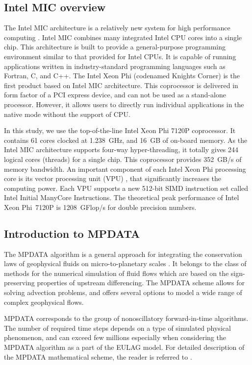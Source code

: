 \documentclass{acm_proc_article-sp}
\begin{document}
\subsection{Intel MIC overview}

The Intel MIC architecture is a relatively new system for high performance computing \cite{MICA}.
Intel MIC combines many integrated Intel CPU cores into a single chip.
This architecture is built to provide a general-purpose programming environment similar to that provided for Intel CPUs.
It is capable of running applications written in industry-standard programming languages such as Fortran, C, and C++.
The Intel Xeon Phi (codenamed Knights Corner) is the first product based on Intel MIC architecture.
This coprocessor is delivered in form factor of a PCI express device, and can not be used as a stand-alone processor.
However, it allows users to directly run individual applications in the native mode without the support of CPU.

In this study, we use the top-of-the-line Intel Xeon Phi 7120P coprocessor.
It contains 61 cores clocked at 1.238~GHz, and 16~GB of on-board memory.
As the Intel MIC architecture supports four-way hyper-threading, it totally gives 244 logical cores (threads) for a single chip.
This coprocessor provides 352~GB/s of memory bandwidth.
An important component of each Intel Xeon Phi processing core is its vector processing unit (VPU) \cite{SZU15}, that significantly increases the computing power.
Each VPU supports a new 512-bit SIMD instruction set called Intel Initial ManyCore Instructions.   
The theoretical peak performance of Intel Xeon Phi~7120P is 1208~GFlop/s for double precision numbers.

\subsection{Introduction to MPDATA}

The MPDATA algorithm is a general approach for integrating the conservation laws of geophysical fluids on micro-to-planetary scales \cite{SMO01}.
It belongs to the class of methods for the numerical simulation of fluid flows which are based on the sign-preserving properties of upstream differencing.
The MPDATA scheme allows for solving advection problems, and offers several options to model a wide range of complex geophysical flows.

MPDATA corresponds to the group of nonoscillatory forward-in-time algorithms.
The number of required time steps depends on a type of simulated physical phenomenon, and can exceed few millions especially when considering the MPDATA algorithm as a part of the EULAG model. 
For detailed description of the MPDATA mathematical scheme, the reader is referred to \cite{SMO06,SMO90,SMO01}.
\end{document}
